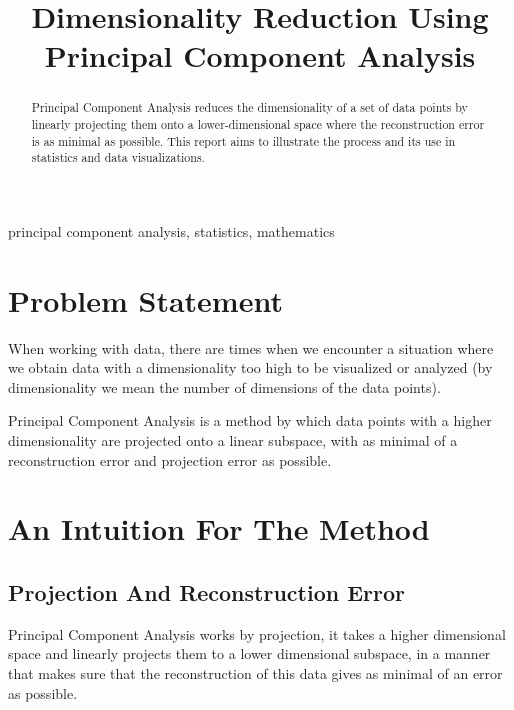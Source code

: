 \documentclass[conference]{IEEEtran}
\begin{document}
\title{Dimensionality Reduction Using Principal Component Analysis\\
{}
}

\author{
	\and
}

\maketitle

\begin{abstract}
	Principal Component Analysis reduces the dimensionality of a set of data points by linearly projecting them onto a lower-dimensional space where the reconstruction error is as minimal as possible. This report aims to illustrate the process and its use in statistics and data visualizations.
\end{abstract}

\begin{IEEEkeywords}
	principal component analysis, statistics, mathematics
\end{IEEEkeywords}
\section{Problem Statement}
When working with data, there are times when we encounter a situation where we obtain data with a dimensionality too high to be visualized or analyzed (by dimensionality we mean the number of dimensions of the data points).

Principal Component Analysis is a method by which data points with a higher dimensionality are projected onto a linear subspace, with as minimal of a reconstruction error and projection error as possible.
\section{An Intuition For The Method}
\subsection{Projection And Reconstruction Error}
Principal Component Analysis works by projection, it takes a higher dimensional space and linearly projects them to a lower dimensional subspace, in a manner that makes sure that the reconstruction of this data gives as minimal of an error as possible.
\end{document}
